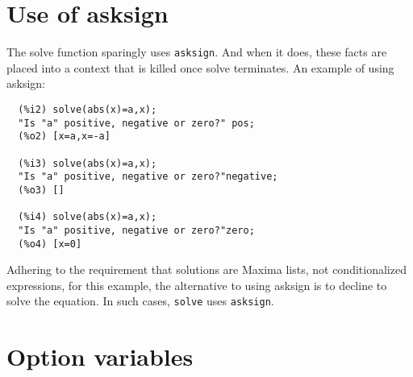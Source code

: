 \documentclass[]{scrartcl}
\begin{document}
\section{Use of asksign}

The solve function sparingly uses \texttt{asksign}. And when it does, these facts are placed into a context that is killed once solve terminates. An example of using asksign:

\begin{verbatim}
  (%i2)	solve(abs(x)=a,x);
  "Is "a" positive, negative or zero?" pos;
  (%o2)	[x=a,x=-a]

  (%i3)	solve(abs(x)=a,x);
  "Is "a" positive, negative or zero?"negative;
  (%o3)	[]

  (%i4)	solve(abs(x)=a,x);
  "Is "a" positive, negative or zero?"zero;
  (%o4)	[x=0]
\end{verbatim}
Adhering to the requirement that solutions are Maxima lists, not conditionalized expressions, for this example, the alternative to using asksign is to decline to solve the equation. In such cases, \texttt{solve}
uses \texttt{asksign}.

\section{Option variables}
\end{document}
